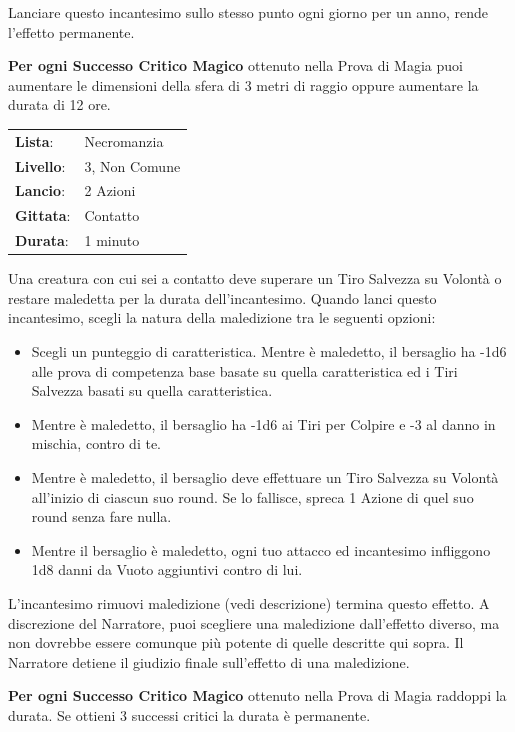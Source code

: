 \begin{multicols}{2}
Lanciare questo incantesimo sullo stesso punto ogni giorno per un anno, rende l'effetto permanente.

\textbf{Per ogni Successo Critico Magico} ottenuto nella Prova di Magia puoi aumentare le dimensioni della sfera di 3 metri di raggio oppure aumentare la durata di 12 ore.

\noindent\begin{tabularx}{\linewidth}{p{1.3cm}X}
	\rowcolor{gray!20}\textbf{Lista}: & Necromanzia \\
	\textbf{Livello}: & 3, Non Comune \\
	\rowcolor{gray!20}\textbf{Lancio}: & 2 Azioni \\
	\textbf{Gittata}: & Contatto \\
	\rowcolor{gray!20}\textbf{Durata}: & 1 minuto \\
\end{tabularx}\smallskip

Una creatura con cui sei a contatto deve superare un Tiro Salvezza su Volontà o restare maledetta per la durata dell'incantesimo. Quando lanci questo incantesimo, scegli la natura della maledizione tra le seguenti opzioni:

\begin{itemize}[leftmargin=*] \setlength{\itemsep}{0pt}
	\item Scegli un punteggio di caratteristica. Mentre è maledetto, il bersaglio ha -1d6 alle prova di competenza base basate su quella caratteristica ed i Tiri Salvezza basati su quella caratteristica.
	\item Mentre è maledetto, il bersaglio ha -1d6 ai Tiri per Colpire e -3 al danno in mischia, contro di te.
	\item Mentre è maledetto, il bersaglio deve effettuare un Tiro Salvezza su Volontà all'inizio di ciascun suo round. Se lo fallisce, spreca 1 Azione di quel suo round senza fare nulla.
	\item Mentre il bersaglio è maledetto, ogni tuo attacco ed incantesimo infliggono 1d8 danni da Vuoto aggiuntivi contro di lui.
\end{itemize}

L'incantesimo rimuovi maledizione (vedi descrizione) termina questo effetto. A discrezione del Narratore, puoi scegliere una maledizione dall'effetto diverso, ma non dovrebbe essere comunque più potente di quelle descritte qui sopra. Il Narratore detiene il giudizio finale sull'effetto di una maledizione.

\textbf{Per ogni Successo Critico Magico} ottenuto nella Prova di Magia raddoppi la durata. Se ottieni 3 successi critici la durata è permanente.


\end{multicols}
